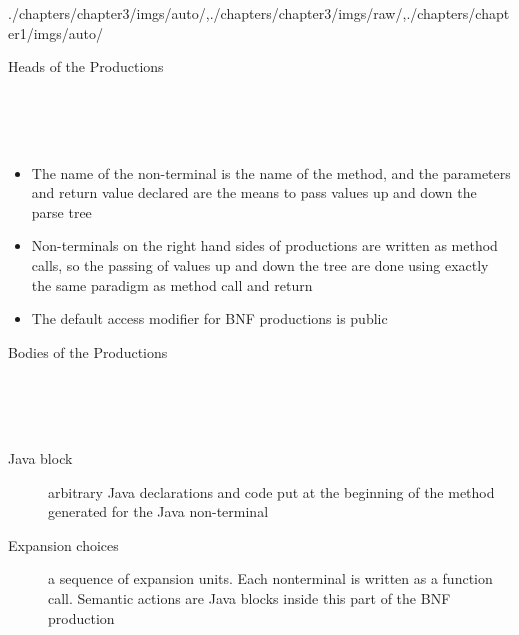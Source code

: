 \begin{graphicspathcontext}{{./chapters/chapter3/imgs/auto/},{./chapters/chapter3/imgs/raw/},{./chapters/chapter1/imgs/auto/}}
\begin{bibunit}[apalike]
\begin{frame}[t]{Heads of the Productions}
	\begin{definition}\small
		 \\
		 \\
		 \\
	\end{definition}
	\begin{itemize}
	\item The name of the non-terminal is the name of the method, and the parameters and return value declared are the means to pass values up and down the parse tree
	\item Non-terminals on the right hand sides of productions are written as method calls, so the passing of values up and down the tree are done using exactly the same paradigm as method call and return
	\item The default access modifier for BNF productions is public
	\end{itemize}
\end{frame}

\begin{frame}[t]{Bodies of the Productions}
	\begin{definition}\small
		 \\
		 \\
		 \\
	\end{definition}
	\begin{description}
	\item[Java block] arbitrary Java declarations and code put at the beginning of the method generated for the Java non-terminal
	\item[Expansion choices] a sequence of expansion units. Each nonterminal is written as a function call. Semantic actions are Java blocks inside this part of the BNF production
	\end{description}
\end{frame}


\end{bibunit}
\end{graphicspathcontext}
